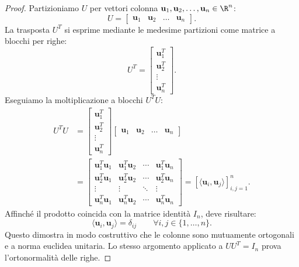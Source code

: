 \begin{proof}
Partizioniamo $U$ per vettori colonna $\mathbf{u}_1, \mathbf{u}_2, \dots, \mathbf{u}_n \in \R^n$:
\begin{equation}
    U = \begin{bmatrix} \mathbf{u}_1 & \mathbf{u}_2 & \dots & \mathbf{u}_n \end{bmatrix}.
\end{equation}
La trasposta $U^T$ si esprime mediante le medesime partizioni come matrice a blocchi per righe:
\begin{equation}
    U^T = \begin{bmatrix} \mathbf{u}_1^T \\ \mathbf{u}_2^T \\ \vdots \\ \mathbf{u}_n^T \end{bmatrix}.
\end{equation}
Eseguiamo la moltiplicazione a blocchi $U^T U$:
\begin{align}
    U^T U &= \begin{bmatrix} \mathbf{u}_1^T \\ \mathbf{u}_2^T \\ \vdots \\ \mathbf{u}_n^T \end{bmatrix} \begin{bmatrix} \mathbf{u}_1 & \mathbf{u}_2 & \dots & \mathbf{u}_n \end{bmatrix} \nonumber \\
    &= \begin{bmatrix}
        \mathbf{u}_1^T \mathbf{u}_1 & \mathbf{u}_1^T \mathbf{u}_2 & \cdots & \mathbf{u}_1^T \mathbf{u}_n \\
        \mathbf{u}_2^T \mathbf{u}_1 & \mathbf{u}_2^T \mathbf{u}_2 & \cdots & \mathbf{u}_2^T \mathbf{u}_n \\
        \vdots & \vdots & \ddots & \vdots \\
        \mathbf{u}_n^T \mathbf{u}_1 & \mathbf{u}_n^T \mathbf{u}_2 & \cdots & \mathbf{u}_n^T \mathbf{u}_n
    \end{bmatrix} = \left[ \langle \mathbf{u}_i, \mathbf{u}_j \rangle \right]_{i,j=1}^n.
\end{align}
Affinch\'e il prodotto coincida con la matrice identit\`a $I_n$, deve risultare:
\begin{equation}
    \langle \mathbf{u}_i, \mathbf{u}_j \rangle = \delta_{ij} \qquad \forall i, j \in \{1, \dots, n\}.
\end{equation}
Questo dimostra in modo costruttivo che le colonne sono mutuamente ortogonali e a norma euclidea unitaria. Lo stesso argomento applicato a $U U^T = I_n$ prova l'ortonormalit\`a delle righe.
\end{proof}


